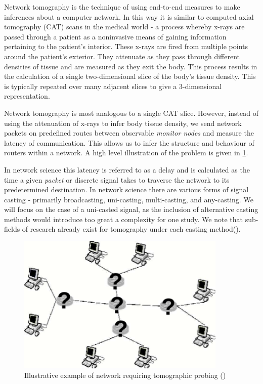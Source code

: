 Network tomography is the technique of using end-to-end measures to make inferences about a computer network. In this way it is similar to computed axial tomography (CAT) scans in the medical world - a process whereby x-rays are passed through a patient as a noninvasive means of gaining information pertaining to the patient's interior. These x-rays are fired from multiple points around the patient's exterior. They attenuate as they pass through different densities of tissue and are measured as they exit the body. This process results in the calculation of a single two-dimensional slice of the body's tissue density. This is typically repeated over many adjacent slices to give a 3-dimensional representation.\par
Network tomography is most analogous to a single CAT slice. However, instead of using the attenuation of x-rays to infer body tissue density, we send network packets on predefined routes between observable \textit{monitor nodes} and measure the latency of communication. This allows us to infer the structure and behaviour of routers within a network. A high level illustration of the problem is given in \ref{fig:nettom?}.\par
In network science this latency is referred to as a delay and is calculated as the time a given \textit{packet} or discrete signal takes to traverse the network to its predetermined destination. In network science there are various forms of signal casting - primarily broadcasting, uni-casting, multi-casting, and any-casting. We will focus on the case of a uni-casted signal, as the inclusion of alternative casting methods would introduce too great a complexity for one study. We note that sub-fields of research already exist for tomography under each casting method(\cite{lawrence_network_2006}).\par
\begin{figure}
    \centering
    \includegraphics[width=10cm]{figs/intro/nettom-illustration.png}
    \caption[Illustrative example of network requiring tomographic probing]{Illustrative example of network requiring tomographic probing (\cite{lawrence_network_2006})}
    \label{fig:nettom?}
\end{figure}
